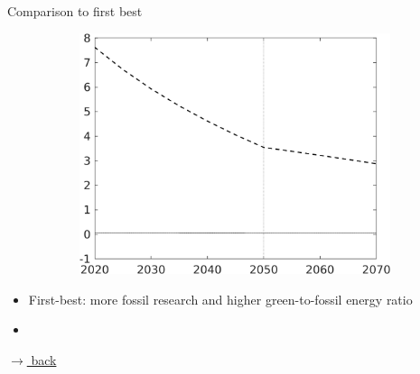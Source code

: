 \documentclass[11pt,aspectratio=169]{beamer}
\begin{document}
\begin{frame}{Comparison to first best}
\begin{figure}
\begin{subfigure}{0.45\textwidth}
			\includegraphics[width=1\textwidth]{../codding_model/own_basedOnFried/optimalPol_010922_revision/figures/all_13Sept22_Tplus30/sffsg_slides_CompEffLF_regime4_knspil0_spillover0_noskill0_sep0_xgrowth0_countec0_PV1_etaa0.79_lgd0.png}
		\end{subfigure}
	\end{figure}
	\vspace{1mm}
	\begin{block}{}
		\begin{itemize}
			\item<+-> First-best: more fossil research and higher green-to-fossil energy ratio
			\item [] %
		\end{itemize}
	\end{block}	
	
	\vspace{-5.5mm}
	\hfill	\hyperlink{mec}{\tiny{$\rightarrow$ back}}
\end{frame}
\end{document}
